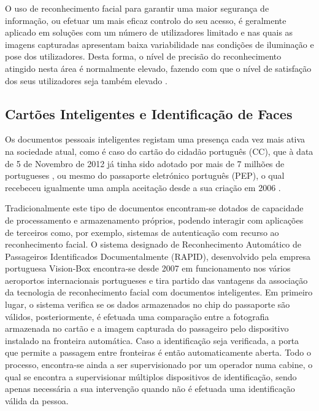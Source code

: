 O uso de reconhecimento facial para garantir uma maior segurança de informação, ou efetuar um mais eficaz controlo do seu acesso, é geralmente aplicado em soluções com um número de utilizadores limitado e nas quais as imagens capturadas apresentam baixa variabilidade nas condições de iluminação e pose dos utilizadores. Desta forma, o nível de precisão do reconhecimento atingido nesta área é normalmente elevado, fazendo com que o nível de satisfação dos seus utilizadores seja também elevado \cite{Li2011}.

\subsection{Cartões Inteligentes e Identificação de Faces} \label{CartoesInteligentes}
Os documentos pessoais inteligentes registam uma presença cada vez mais ativa na sociedade atual, como é caso do cartão do cidadão português (CC), que à data de 5 de Novembro de 2012 já tinha sido adotado por mais de 7 milhões de portugueses \citep{Administrativa}, ou mesmo do passaporte eletrónico português (PEP), o qual recebeceu igualmente uma ampla aceitação desde a sua criação em 2006 \citep{MinisteriodaAdministracaoInterna}.

Tradicionalmente este tipo de documentos encontram-se dotados de capacidade de processamento e armazenamento próprios, podendo interagir com aplicações de terceiros como, por exemplo, sistemas de autenticação com recurso ao reconhecimento facial. O sistema designado de Reconhecimento Automático de Passageiros Identificados Documentalmente (RAPID)\citep{MinisteriodaAdministracaoInternaa}, desenvolvido pela empresa portuguesa Vision-Box \citep{Vision-Box} encontra-se desde 2007 em funcionamento nos vários aeroportos internacionais portugueses e tira partido das vantagens da associação da tecnologia de reconhecimento facial com documentos inteligentes. Em primeiro lugar, o sistema verifica se os dados armazenados no chip do passaporte são válidos, posteriormente, é efetuada uma comparação entre a fotografia armazenada no cartão e a imagem capturada do passageiro pelo dispositivo instalado na fronteira automática. Caso a identificação seja verificada, a porta que permite a passagem entre fronteiras é então automaticamente aberta. Todo o processo, encontra-se ainda a ser supervisionado por um operador numa cabine, o qual se encontra a supervisionar múltiplos dispositivos de identificação, sendo apenas necessária a sua intervenção quando não é efetuada uma identificação válida da pessoa.

